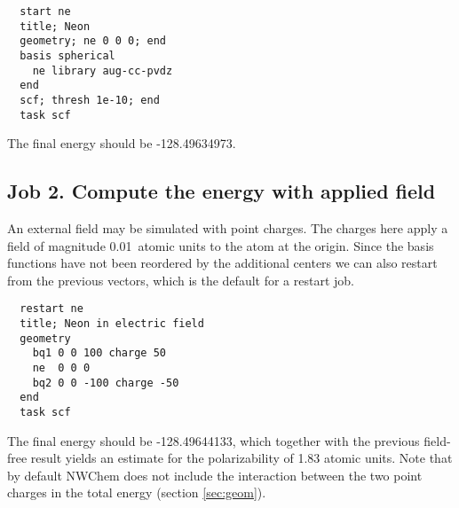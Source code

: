 \begin{verbatim}
  start ne
  title; Neon
  geometry; ne 0 0 0; end
  basis spherical 
    ne library aug-cc-pvdz
  end
  scf; thresh 1e-10; end
  task scf
\end{verbatim}

The final energy should be -128.49634973.

\subsection{Job 2. Compute the energy with applied field}

An external field may be simulated with point charges.  The charges
here apply a field of magnitude 0.01\ atomic units to the atom at the
origin.  Since the basis functions have not been reordered by the
additional centers we can also restart from the previous vectors,
which is the default for a restart job.

\begin{verbatim}
  restart ne
  title; Neon in electric field
  geometry
    bq1 0 0 100 charge 50
    ne  0 0 0
    bq2 0 0 -100 charge -50
  end
  task scf
\end{verbatim}

The final energy should be -128.49644133, which together with the
previous field-free result yields an estimate for the polarizability
of 1.83 atomic units.  Note that by default NWChem does not include
the interaction between the two point charges in the total energy
(section \ref{sec:geom}).


